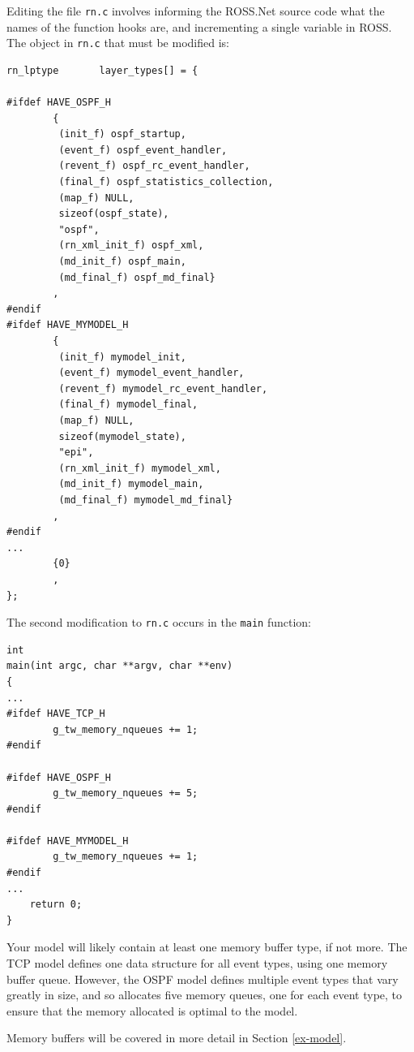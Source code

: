 \documentclass[12pt]{article}
\begin{document}
Editing the file {\tt rn.c} involves informing the ROSS.Net source code what
the names of the function hooks are, and incrementing a single variable in
ROSS.  The object in {\tt rn.c} that must be modified is:

\begin{small}
\begin{verbatim}
rn_lptype       layer_types[] = {

#ifdef HAVE_OSPF_H
        {
         (init_f) ospf_startup,
         (event_f) ospf_event_handler,
         (revent_f) ospf_rc_event_handler,
         (final_f) ospf_statistics_collection,
         (map_f) NULL,
         sizeof(ospf_state),
         "ospf",
         (rn_xml_init_f) ospf_xml,
         (md_init_f) ospf_main,
         (md_final_f) ospf_md_final}
        ,
#endif
#ifdef HAVE_MYMODEL_H
        {
         (init_f) mymodel_init,
         (event_f) mymodel_event_handler,
         (revent_f) mymodel_rc_event_handler,
         (final_f) mymodel_final,
         (map_f) NULL,
         sizeof(mymodel_state),
         "epi",
         (rn_xml_init_f) mymodel_xml,
         (md_init_f) mymodel_main,
         (md_final_f) mymodel_md_final}
        ,
#endif
...
        {0}
        ,
};
\end{verbatim}\end{small}

The second modification to {\tt rn.c} occurs in the {\tt main} function:

\begin{small}
\begin{verbatim}
int
main(int argc, char **argv, char **env)
{
...
#ifdef HAVE_TCP_H
        g_tw_memory_nqueues += 1;
#endif

#ifdef HAVE_OSPF_H
        g_tw_memory_nqueues += 5;
#endif

#ifdef HAVE_MYMODEL_H
        g_tw_memory_nqueues += 1;
#endif
...
    return 0;
}
\end{verbatim}
\end{small}

Your model will likely contain at least one memory buffer type, if not more.
The TCP model defines one data structure for all event types, using one memory
buffer queue.  However, the OSPF model defines multiple event types that vary
greatly in size, and so allocates five memory queues, one for each event type,
to ensure that the memory allocated is optimal to the model.

Memory buffers will be covered in more detail in Section \ref{ex-model}.
\end{document}
